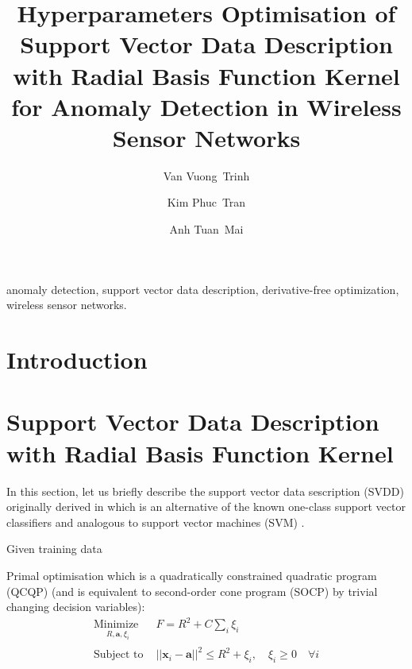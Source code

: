 \documentclass[3p,times]{elsarticle}
\begin{document}
\begin{frontmatter}

\title{Hyperparameters Optimisation of Support Vector Data Description with Radial Basis Function Kernel for Anomaly Detection in Wireless Sensor Networks}

\author[donga]{Van Vuong~Trinh}

\author[donga]{Kim Phuc~Tran}

\author[hust]{Anh Tuan~Mai}

\address[donga]{Dong A University, Vietnam}  
\address[hust]{International Training Institute for Materials Science (ITIMS)\\Hanoi University of Technology, Vietnam} 

\begin{keyword}
anomaly detection, support vector data description, derivative-free optimization, wireless sensor networks.
\end{keyword}

\begin{abstract}
\end{abstract}

\end{frontmatter}

\section{Introduction}

\section{Support Vector Data Description with Radial Basis Function Kernel}

In this section, let us briefly describe the support vector data sescription (SVDD) originally derived in \cite{Tax2004} which is an alternative of the known one-class support vector classifiers \cite{Scholkopf2000} and analogous to support vector machines (SVM) \cite{Vapnik1998}.

Given training data

Primal optimisation which is a quadratically constrained quadratic program (QCQP) (and is equivalent to second-order cone program (SOCP) by trivial changing decision variables):
\begin{subequations}\label{eq:svdd_primal}
\begin{align}
\underset{
	\begin{array}{c}
		 R, \mathbf{a}, \xi_i
	\end{array}}{\text{Minimize }} & F = R^2 + C \sum_i \xi_i \\
\text{Subject to } & \left|\left| \mathbf{x}_i - \mathbf{a} \right|\right|^2 \le R^2 + \xi_i, \quad \xi_i \ge 0 \quad \forall i
\end{align}
\end{subequations}
\end{document}
